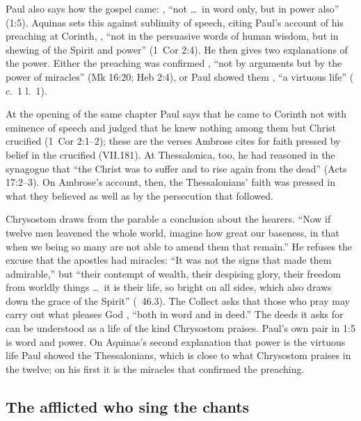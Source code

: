 Paul also says how the gospel came: , ``not \dots\ in word only, but in power also'' (1:5). Aquinas
sets this against sublimity of speech, citing Paul's account of his preaching
at Corinth, , ``not in the persuasive words of human
wisdom, but in shewing of the Spirit and power'' (1~Cor 2:4). He then gives
two explanations of the power. Either the preaching was confirmed , ``not by arguments but by the power of
miracles'' (Mk 16:20; Heb 2:4), or Paul showed them ,
``a virtuous life'' ( c.~1 l.~1).

At the opening of the same chapter Paul says that he came to Corinth not
with eminence of speech and judged that he knew nothing among them but Christ
crucified (1~Cor 2:1--2); these are the verses Ambrose cites for faith pressed
by belief in the crucified (VII.181). At Thessalonica, too, he had reasoned
in the synagogue that ``the Christ was to suffer and to rise again from the
dead'' (Acts 17:2--3). On Ambrose's account, then, the Thessalonians' faith
was pressed in what they believed as well as by the persecution that
followed.

Chrysostom draws from the parable a conclusion about the hearers. ``Now if
twelve men leavened the whole world, imagine how great our baseness, in that
when we being so many are not able to amend them that remain.'' He refuses
the excuse that the apostles had miracles: ``It was not the signs that made
them admirable,'' but ``their contempt of wealth, their despising glory, their
freedom from worldly things \dots\ it is their life, so bright on all sides,
which also draws down the grace of the Spirit'' (~46.3). The
Collect asks that those who pray may carry out what pleases God , ``both in word and in deed.'' The deeds it asks for
can be understood as a life of the kind Chrysostom praises. Paul's own pair in
1:5 is word and power. On Aquinas's second explanation that power is the
virtuous life Paul showed the Thessalonians, which is close to what Chrysostom
praises in the twelve; on his first it is the miracles that confirmed the
preaching.

\subsection{The afflicted who sing the chants}
\label{sec:seed-chants}

